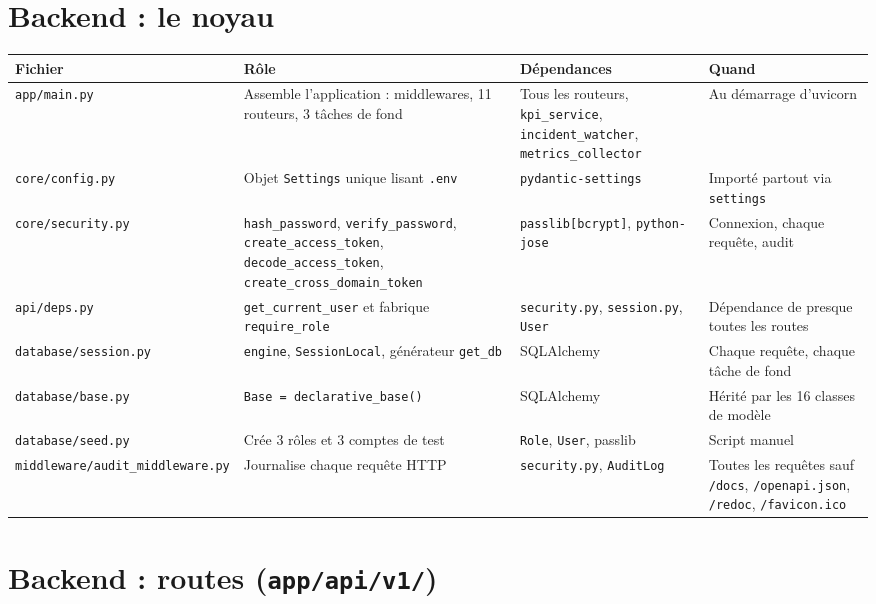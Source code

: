 \documentclass[11pt,a4paper]{report}
\newcommand{\file}[1]{\texttt{\small #1}}
\newcommand{\fn}[1]{\texttt{\small\textcolor{oasisviolet}{#1}}}
\newcommand{\cls}[1]{\texttt{\small\textcolor{oasisblue}{#1}}}
\begin{document}
\clearpage

\section{Backend : le noyau}

\begin{longtable}{@{}p{3.2cm}p{4.1cm}p{3.5cm}p{3.4cm}@{}}
\toprule
\textbf{Fichier} & \textbf{Rôle} & \textbf{Dépendances} & \textbf{Quand}\\
\midrule
\endhead
\file{app/main.py} & Assemble l'application : middlewares, 11 routeurs, 3 tâches de fond & Tous les routeurs, \file{kpi\_service}, \file{incident\_watcher}, \file{metrics\_collector} & Au démarrage d'uvicorn\\
\file{core/config.py} & Objet \cls{Settings} unique lisant \file{.env} & \texttt{pydantic-settings} & Importé partout via \fn{settings}\\
\file{core/security.py} & \fn{hash\_password}, \fn{verify\_password}, \fn{create\_access\_token}, \fn{decode\_access\_token}, \fn{create\_cross\_domain\_token} & \texttt{passlib[bcrypt]}, \texttt{python-jose} & Connexion, chaque requête, audit\\
\file{api/deps.py} & \fn{get\_current\_user} et fabrique \fn{require\_role} & \file{security.py}, \file{session.py}, \cls{User} & Dépendance de presque toutes les routes\\
\file{database/session.py} & \fn{engine}, \fn{SessionLocal}, générateur \fn{get\_db} & SQLAlchemy & Chaque requête, chaque tâche de fond\\
\file{database/base.py} & \fn{Base = declarative\_base()} & SQLAlchemy & Hérité par les 16 classes de modèle\\
\file{database/seed.py} & Crée 3 rôles et 3 comptes de test & \cls{Role}, \cls{User}, passlib & Script manuel\\
\file{middleware/audit\_middleware.py} & Journalise chaque requête HTTP & \file{security.py}, \cls{AuditLog} & Toutes les requêtes sauf \file{/docs}, \file{/openapi.json}, \file{/redoc}, \file{/favicon.ico}\\
\bottomrule
\end{longtable}

\section{Backend : routes (\file{app/api/v1/})}
\end{document}
